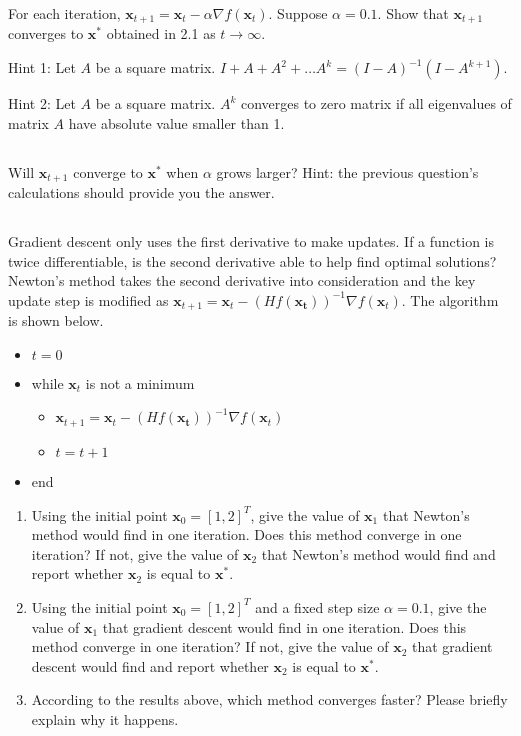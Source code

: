 \documentclass{exam}
\begin{document}
For each iteration, $\bm{x}_{t+1} = \bm{x}_t - \alpha \nabla f(\bm{x}_t)$. Suppose $\alpha=0.1$. Show that $\bm{x}_{t+1}$ converges to $\bm{x}^*$ obtained in 2.1 as $t \rightarrow \infty$. 

Hint 1: Let $A$ be a square matrix. $I+A+A^2 + \hdots A^{k} = (I-A)^{-1}(I-A^{k+1})$. 

Hint 2: Let $A$ be a square matrix. $A^k$ converges to zero matrix if all eigenvalues of matrix $A$ have absolute value smaller than 1.  

\subsection{}
Will $\bm{x}_{t+1}$ converge to $\bm{x}^*$ when $\alpha$ grows larger? Hint: the previous question's calculations should provide you the answer.

\subsection{}
Gradient descent only uses the first derivative to make updates. If a function is twice differentiable, is the second derivative able to help find optimal solutions? Newton's method takes the second derivative into consideration and the key update step is modified as $\bm{x}_{t+1} = \bm{x}_t - (Hf(\bm{x_t}))^{-1} \nabla f(\bm{x}_t)$. The algorithm is shown below. 

\begin{itemize}
    \item $t=0$
    \item while $\bm{x}_t$ is not a minimum
    \begin{itemize}
        \item $\bm{x}_{t+1} = \bm{x}_t - (Hf(\bm{x_t}))^{-1} \nabla f(\bm{x}_t)$
        \item $t = t+1$
    \end{itemize}
    \item end
\end{itemize}

\begin{enumerate}[label=(\alph*)]
    \item Using the initial point $\bm{x}_0 = [1,2]^T$, give the value of $\bm{x}_1$ that Newton's method would find in one iteration. Does this method converge in one iteration? If not, give the value of $\bm{x}_2$ that Newton's method would find and report whether $\bm{x}_2$ is equal to $\bm{x}^*$. 
    
    \item Using the initial point $\bm{x}_0 = [1,2]^T$ and a fixed step size $\alpha=0.1$, give the value of $\bm{x}_1$ that gradient descent would find in one iteration. Does this method converge in one iteration? If not, give the value of $\bm{x}_2$ that gradient descent would find and report whether $\bm{x}_2$ is equal to $\bm{x}^*$.
    
    \item According to the results above, which method converges faster? Please briefly explain why it happens. 
\end{enumerate}
\end{document}

